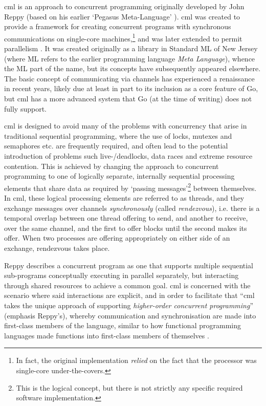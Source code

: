 \Gls{cml} \cite{Reppy1991,Panangaden1997} is an approach to concurrent programming originally developed by John Reppy (based on his earlier `Pegasus Meta-Language' \cite{Reppy1988}).  \Gls{cml} was created to provide a framework for creating concurrent programs with synchronous communications on single-core machines,\footnote{In fact, the original implementation \emph{relied} on the fact that the processor was single-core under-the-covers.} and was later extended to permit parallelism \cite{Reppy2009a}.  It was created originally as a library in Standard ML of New Jersey (where ML refers to the earlier programming language \textit{Meta Language}), whence the ML part of the name, but its concepts have subsequently appeared elsewhere.  The basic concept of communicating via channels has experienced a renaissance in recent years, likely due at least in part to its inclusion as a core feature of Go, but \gls{cml} has a more advanced system that Go (at the time of writing) does not fully support.

\Gls{cml} is designed to avoid many of the problems with concurrency that arise in traditional sequential programming, where the use of locks, mutexes and semaphores etc. are frequently required, and often lead to the potential introduction of problems such live-/deadlocks, data races and extreme resource contention.  This is achieved by changing the approach to concurrent programming to one of logically separate, internally sequential processing elements that share data as required by `passing messages'\footnote{This is the logical concept, but there is not strictly any specific required software implementation.} between themselves.  In \gls{cml}, these logical processing elements are referred to as threads, and they exchange messages over channels \emph{synchronously} (called \emph{rendezvous}), i.e. there is a temporal overlap between one thread offering to send, and another to receive, over the same channel, and the first to offer blocks until the second makes its offer.  When two processes are offering appropriately on either side of an exchange, rendezvous takes place.

Reppy describes a concurrent program as one that supports multiple sequential sub-programs conceptually executing in parallel separately, but interacting through shared resources to achieve a common goal.  \Gls{cml} is concerned with the scenario where said interactions are explicit, and in order to facilitate that \enquote{\gls{cml} takes the unique approach of supporting \emph{higher-order concurrent programming}} (emphasis Reppy's), whereby communication and synchronisation are made into first-class members of the language, similar to how functional programming languages made functions into first-class members of themselves \cite[Preface]{Reppy2007}.

